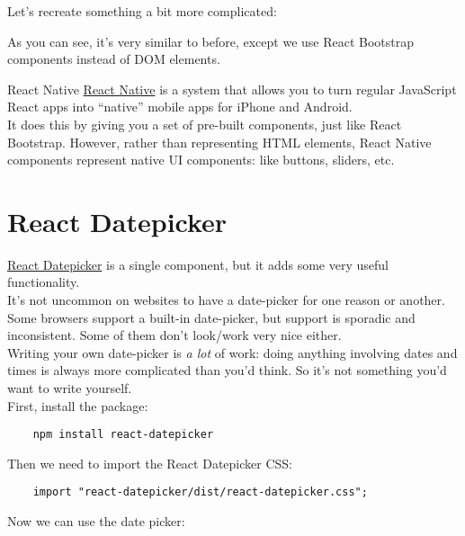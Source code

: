 Let's recreate something a bit more complicated:


As you can see, it's very similar to before, except we use React Bootstrap components instead of DOM elements.


\begin{infobox}{React Native}
    \href{https://facebook.github.io/react-native/}{React Native} is a system that allows you to turn regular JavaScript React apps into ``native'' mobile apps for iPhone and Android.
    \\

    It does this by giving you a set of pre-built components, just like React Bootstrap. However, rather than representing HTML elements, React Native components represent native UI components: like buttons, sliders, etc.
\end{infobox}


\section{React Datepicker}

\href{https://github.com/Hacker0x01/react-datepicker/}{React Datepicker} is a single component, but it adds some very useful functionality.
\\

It's not uncommon on websites to have a date-picker for one reason or another. Some browsers support a built-in date-picker, but support is sporadic and inconsistent. Some of them don't look/work very nice either.
\\

Writing your own date-picker is \textit{a lot} of work: doing anything involving dates and times is always more complicated than you'd think. So it's not something you'd want to write yourself.
\\

First, install the package:

\begin{verbatim}
    npm install react-datepicker
\end{verbatim}

Then we need to import the React Datepicker CSS:

\begin{verbatim}
    import "react-datepicker/dist/react-datepicker.css";
\end{verbatim}

Now we can use the date picker:

